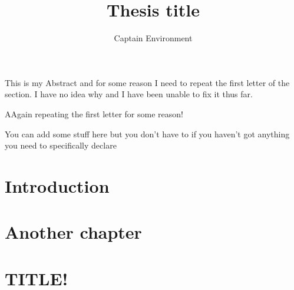 \documentclass[]{yorkThesis}  %
\title{Thesis title}
\author{Captain Environment}
\begin{document}
\titlePage
\abstract
{}
This is my Abstract and for some reason I need to repeat the first letter of the section. I have no idea why and I have been unable to fix it thus far.

\contents

\acknowledgments
AAgain repeating the first letter for some reason!

\declaration
You can add some stuff here but you don't have to if you haven't got anything you need to specifically declare

\pagestyle{headings}
\chapter{Introduction}\label{chapter1}


\chapter{Another chapter}\label{chapter2}


\appendix
\chapter{TITLE!}
\label{Appendix1}

%

{}  %


\end{document}
